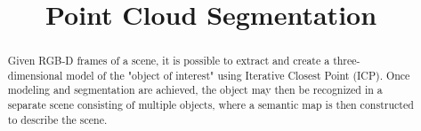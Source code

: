 \documentclass[conference]{IEEEtran}
\begin{document}
%
\title{Point Cloud Segmentation}


\author{
\and
{}
\and
{}
}


\maketitle

\begin{abstract}
Given RGB-D frames of a scene, it is possible to extract and create a three-dimensional
model of the "object of interest" using Iterative Closest Point (ICP). Once modeling and
segmentation are achieved, the object may then be recognized in a separate scene
consisting of multiple objects, where a semantic map is then constructed to describe the
scene. 
\end{abstract}





%
\IEEEpeerreviewmaketitle
\end{document}
